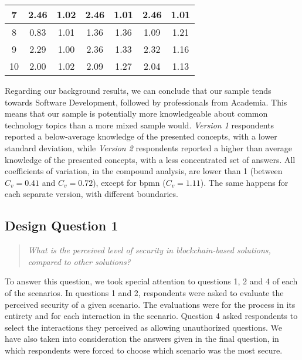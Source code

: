 \begin{table}[htb]
\begin{tabular}{c|cc|cc|cc}
		\hline
		7           & 2.46                                     & 1.02                                     & 2.46                         & 1.01         & 2.46        & 1.01         \\
		\hline
		8           & 0.83                                     & 1.01                                     & 1.36                         & 1.36         & 1.09        & 1.21         \\
		\hline
		9           & 2.29                                     & 1.00                                     & 2.36                         & 1.33         & 2.32        & 1.16         \\
		\hline
		10          & 2.00                                     & 1.02                                     & 2.09                         & 1.27         & 2.04        & 1.13         \\
		\hline
	\end{tabular}
\end{table}

Regarding our background results, we can conclude that our sample tends towards Software Development, followed by professionals from Academia. This means that our sample is potentially more knowledgeable about common technology topics than a more mixed sample would. \textit{Version 1} respondents reported a below-average knowledge of the presented concepts, with a lower standard deviation, while \textit{Version 2} respondents reported a higher than average knowledge of the presented concepts, with a less concentrated set of answers. All coefficients of variation, in the compound analysis, are lower than 1 (between $C_v = 0.41$ and $C_v = 0.72$), except for \gls{bpmn} ($C_v = 1.11$). The same happens for each separate version, with different boundaries.

\subsection{Design Question 1}

\begin{quote}
	\textit{What is the perceived level of security in blockchain-based solutions, compared to other solutions?}
\end{quote}

To answer this question, we took special attention to questions 1, 2 and 4 of each of the scenarios. In questions 1 and 2, respondents were asked to evaluate the perceived security of a given scenario. The evaluations were for the process in its entirety and for each interaction in the scenario. Question 4 asked respondents to select the interactions they perceived as allowing unauthorized questions. We have also taken into consideration the answers given in the final question, in which respondents were forced to choose which scenario was the most secure.

